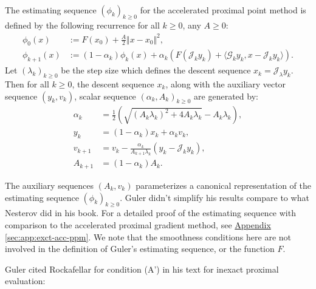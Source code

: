 \documentclass[12pt]{article}
\begin{document}
    \begin{definition}\label{def:nes-est-seq-acc-ppm}
        \; \\
        The estimating sequence  $(\phi_k)_{k \ge0}$ for the accelerated proximal point method is defined by the following recurrence for all $k \ge0$, any $A \ge 0$: 
        \begin{align*}
            \phi_0(x) &:= F(x_0) + \frac{A}{2}\Vert x - x_0\Vert^2, 
            \\
            \phi_{k + 1}(x) &:= 
            (1 - \alpha_k)\phi_k(x)
            + 
            \alpha_k(F(\mathcal J_k y_k) + \langle \mathcal G_k y_k, x - \mathcal J_k y_k\rangle).    
        \end{align*}
        Let $(\lambda_k)_{k \ge 0}$ be the step size which defines the descent sequence $x_k = \mathcal J_\lambda y_k$. 
        Then for all $k \ge 0$, the descent sequence $x_k$, along with the auxiliary vector sequence $(y_k, v_k)$, scalar sequence $(\alpha_k, A_k)_{k\ge 0}$ are generated by: 
        \begin{align*}
            \alpha_k &= \frac{1}{2}\left(
                \sqrt{(A_k\lambda_k)^2 + 4A_k \lambda_k}
                - A_k\lambda_k
            \right), 
            \\
            y_k &= (1 - \alpha_k)x_k + \alpha_k v_k, 
            \\
            v_{k + 1}
            &= 
            v_k - \frac{\alpha_k}{A_{k + 1}\lambda_k}(y_k - \mathcal J_k y_k), 
            \\
            A_{k + 1} &= (1 - \alpha_k)A_k. 
        \end{align*}
    \end{definition}
    \begin{remark}
        The auxiliary sequences $(A_k, v_k)$ parameterizes a canonical representation of the estimating sequence $(\phi_k)_{k \ge0}$. 
        Guler didn't simplify his results compare to what Nesterov did in his book. 
        For a detailed proof of the estimating sequence with comparison to the accelerated proximal gradient method, see 
        \hyperref[sec:app:exct-acc-ppm]{Appendix \ref*{sec:app:exct-acc-ppm}}. 
        We note that the smoothness conditions here are not involved in the definition of Guler's estimating sequence, or the function $F$. 
    \end{remark}
    Guler cited Rockafellar \cite{rockafellar_monotone_1976} for condition (A') in his text for inexact proximal evaluation: 
\end{document}
